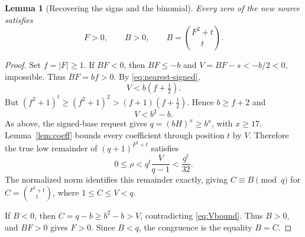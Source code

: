 \documentclass[11pt,letterpaper]{article}
\newtheorem{lemma}[theorem]{Lemma}
\theoremstyle{remark}\newtheorem{remark}[theorem]{Remark}
\begin{document}
\begin{lemma}[Recovering the signs and the binomial]\label{lem:signs}
Every zero of the new source satisfies
\[
 F>0,\qquad B>0,\qquad B=\binom{F^2+t}{t}.
\]
\end{lemma}
\begin{proof}
Set $f=|F|\ge1$. If $BF<0$, then $BF\le-b$ and $V=BF-s<-b/2<0$, impossible. Thus $BF=bf>0$. By \eqref{eq:nearest-signed},
\[
 V<b(f+\tfrac12).
\]
But $(f^2+1)^t\ge(f^2+1)^2>(f+1)(f+\tfrac12)$. Hence $b\ge f+2$ and
\begin{equation}\label{eq:Vbound}
 V<b^2-b.
\end{equation}
As above, the signed-base request gives $q=(bH)^x\ge b^x$, with $x\ge17$. Lemma~\ref{lem:coeff} bounds every coefficient through position $t$ by $V$. Therefore the true low remainder of $(q+1)^{F^2+t}$ satisfies
\[
 0\le\rho<q^t\frac{V}{q-1}<\frac{q^t}{32}.
\]
The normalized norm identifies this remainder exactly, giving $C\equiv B\pmod q$ for $C=\binom{F^2+t}{t}$, where $1\le C\le V<q$.

If $B<0$, then $C=q-b\ge b^2-b>V$, contradicting \eqref{eq:Vbound}. Thus $B>0$, and $BF>0$ gives $F>0$. Since $B<q$, the congruence is the equality $B=C$.
\end{proof}
\end{document}

